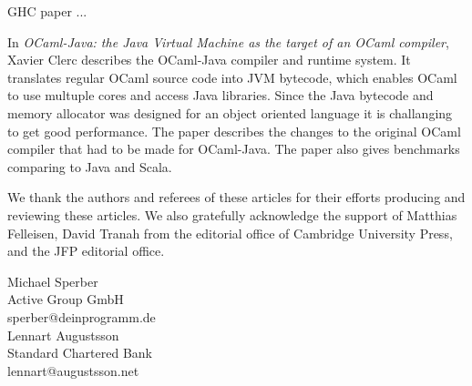 \documentclass{jfp1}
\begin{document}
GHC paper ...

In \textit{OCaml-Java: the Java Virtual Machine as the target of an OCaml compiler},
Xavier Clerc describes the OCaml-Java compiler and runtime system.
It translates regular OCaml source code into JVM bytecode, which enables
OCaml to use multuple cores and access Java libraries.
Since the Java bytecode and memory allocator was designed for an object oriented
language it is challanging to get good performance.
The paper describes the changes to the original OCaml compiler that had to be
made for OCaml-Java.  The paper also gives benchmarks comparing to Java and Scala.

We thank the authors and referees of these articles for their efforts
producing and reviewing these articles.  We also gratefully
acknowledge the support of Matthias Felleisen, David Tranah from the
editorial office of Cambridge University Press, and the JFP editorial
office.

\begin{flushright}
 Michael Sperber\\
  Active Group GmbH\\
  sperber@deinprogramm.de\\[2mm]
  Lennart Augustsson\\
  Standard Chartered Bank\\
  lennart@augustsson.net
\end{flushright}
\end{document}
